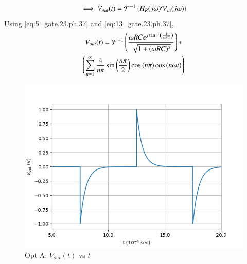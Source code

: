 \documentclass[journal,12pt,twocolumn]{IEEEtran}
\theoremstyle{remark}
\begin{document}
\begin{enumerate}
\begin{align}
        \implies V_{out}(t) &= \mathcal{F}^{-1}\left\{H_R(j\omega)\mathcal{V}_{in}(j\omega)\right\}\\
    \end{align}
    Using \eqref{eq:5_gate.23.ph.37} and \eqref{eq:13_gate.23.ph.37}, 
    \begin{multline}
    V_{out}(t)=\mathcal{F}^{-1}\left(\frac{\omega R C e^{j\tan^{-1}\left(\frac{1}{\omega RC}\right)}}{\sqrt{1 + (\omega R C)^2}}\right)\ast \\ \left(\sum_{n = 1}^{\infty}\frac{4}{n\pi}\sin{\ensuremath{\left(\frac{n\pi}{2}\right)}}\cos\left({n\pi}\right) \cos{\ensuremath{\left(n\omega t\right)}}\right)
    \end{multline}
    \begin{figure}[!h]
        \centering
        \includegraphics[width = \columnwidth]{figs/opt_a_res.png}
        \caption{Opt A: $V_{out}(t)$ vs $t$}
        \label{fig:opt_a_res_gate.23.ph.37}
    \end{figure}


\end{enumerate}
\end{document}
